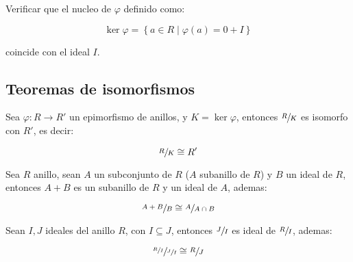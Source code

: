         \begin{ejercicio}
            Verificar que el nucleo de $\varphi$ definido como:

            \begin{equation*}
                \ker{\varphi} = \left\{ a \in R \mid \varphi(a) = 0 + I \right\}
            \end{equation*}

            coincide con el ideal $I$.
        \end{ejercicio}


    \subsection{Teoremas de isomorfismos}

        \begin{teorema}
            Sea $\varphi \colon R \to R'$ un epimorfismo de anillos, y $K = \ker{\varphi}$, entonces $\sfrac{R}{K}$ es isomorfo con $R'$, es decir:

            \begin{equation}
                \sfrac{R}{K} \cong R'
            \end{equation}
        \end{teorema}

        \begin{teorema}
            Sea $R$ anillo, sean $A$ un subconjunto de $R$ ($A$ subanillo de $R$) y $B$ un ideal de $R$, entonces $A + B$ es un subanillo de $R$ y un ideal de $A$, ademas:

            \begin{equation}
                \sfrac{A + B}{B} \cong \sfrac{A}{A \cap B}
            \end{equation}
        \end{teorema}

        \begin{teorema}
            Sean $I, J$ ideales del anillo $R$, con $I \subseteq J$, entonces $\sfrac{J}{I}$ es ideal de $\sfrac{R}{I}$, ademas:

            \begin{equation}
                \sfrac{\sfrac{R}{I}}{\sfrac{J}{I}} \cong \sfrac{R}{J}
            \end{equation}
        \end{teorema}

